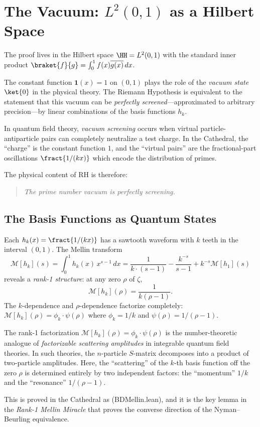 \section{The Vacuum: $L^2(0,1)$ as a Hilbert Space}

The proof lives in the Hilbert space $\HH = L^2(0,1)$ with the standard
inner product $\braket{f}{g} = \int_0^1 f(x)\overline{g(x)}\,dx$.

\begin{principle}
The constant function $\mathbf{1}(x) = 1$ on $(0,1)$ plays the role of
the \emph{vacuum state} $\ket{0}$ in the physical theory. The Riemann
Hypothesis is equivalent to the statement that this vacuum can be
\emph{perfectly screened}---approximated to arbitrary precision---by
linear combinations of the basis functions $h_k$.
\end{principle}

In quantum field theory, \emph{vacuum screening} occurs when virtual
particle-antiparticle pairs can completely neutralize a test charge.
In the Cathedral, the ``charge'' is the constant function $1$, and the
``virtual pairs'' are the fractional-part oscillations $\fract{1/(kx)}$
which encode the distribution of primes.

The physical content of RH is therefore:
\begin{quote}
\emph{The prime number vacuum is perfectly screening.}
\end{quote}

\subsection{The Basis Functions as Quantum States}

Each $h_k(x) = \fract{1/(kx)}$ has a sawtooth waveform with $k$ teeth
in the interval $(0,1)$. The Mellin transform
\[
  \mathcal{M}[h_k](s) = \int_0^1 h_k(x) \, x^{s-1}\,dx = \frac{1}{k \cdot (s-1)}
  - \frac{k^{-s}}{s-1} + k^{-s}\mathcal{M}[h_1](s)
\]
reveals a \emph{rank-1 structure}: at any zero $\rho$ of $\zeta$,
\[
  \mathcal{M}[h_k](\rho) = \frac{1}{k(\rho - 1)}.
\]
The $k$-dependence and $\rho$-dependence factorize completely:
$\mathcal{M}[h_k](\rho) = \phi_k \cdot \psi(\rho)$ where
$\phi_k = 1/k$ and $\psi(\rho) = 1/(\rho-1)$.

\begin{correspondence}[Rank-1 = Factorizable Scattering]
The rank-1 factorization $\mathcal{M}[h_k](\rho) = \phi_k \cdot \psi(\rho)$
is the number-theoretic analogue of \emph{factorizable scattering amplitudes}
in integrable quantum field theories. In such theories, the $n$-particle
$S$-matrix decomposes into a product of two-particle amplitudes. Here,
the ``scattering'' of the $k$-th basis function off the zero $\rho$ is
determined entirely by two independent factors: the ``momentum'' $1/k$
and the ``resonance'' $1/(\rho-1)$.
\end{correspondence}

This is proved in the Cathedral as  (BDMellin.lean),
and it is the key lemma in the \emph{Rank-1 Mellin Miracle} that proves
the converse direction of the Nyman--Beurling equivalence.


